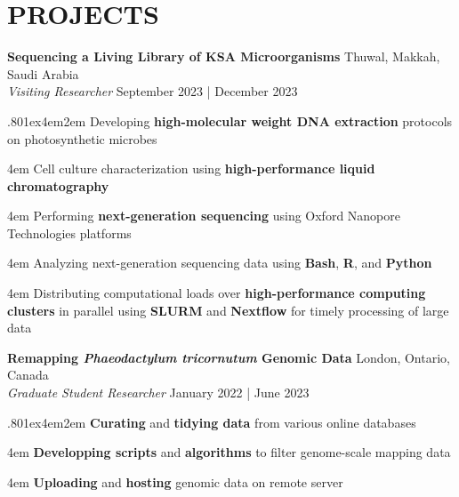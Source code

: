 \documentclass[a4paper,9pt]{extarticle}
\begin{document}
\section*{PROJECTS}
\noindent
\begin{minipage}{1\textwidth}
\setlength{\parindent}{15pt} %
	\noindent
	\textbf{Sequencing a Living Library of KSA Microorganisms} \hfill Thuwal, Makkah, Saudi Arabia\\ %
	\textit{Visiting Researcher}
	\hfill September 2023 | December 2023 \par%
	{\hsize.80\linewidth\parskip1ex\hangindent4em\parindent2em 
	\setlength{\parskip}{0pt} %
		Developing \textbf{high-molecular weight DNA extraction} protocols on photosynthetic microbes\par
		\hangindent4em
		Cell culture characterization using \textbf{high-performance liquid chromatography}\par		
		\hangindent4em
		Performing \textbf{next-generation sequencing} using Oxford Nanopore Technologies platforms\par
		\hangindent4em
		Analyzing next-generation sequencing data using \textbf{Bash}, \textbf{R}, and \textbf{Python}\par
		\hangindent4em
		Distributing computational loads over \textbf{high-performance computing clusters} in parallel using \textbf{SLURM} and \textbf{Nextflow} for timely processing of large data\par}
\end{minipage}
\vspace{\parskip}

\noindent
\begin{minipage}{1\textwidth}
\setlength{\parindent}{15pt} %
	\noindent
	\textbf{Remapping \textit{Phaeodactylum tricornutum} Genomic Data} \hfill London, Ontario, Canada\\ %
	\textit{Graduate Student Researcher}
	\hfill January 2022 | June 2023 \par %
	{\hsize.80\linewidth\parskip1ex\hangindent4em\parindent2em 
	\setlength{\parskip}{0pt} %
		\textbf{Curating} and \textbf{tidying data} from various online databases\par
		\hangindent4em
		\textbf{Developping scripts} and \textbf{algorithms} to filter genome-scale mapping data \par
		\hangindent4em
		\textbf{Uploading} and \textbf{hosting} genomic data on remote server\par}
\end{minipage}
\vspace{\parskip}
\end{document}
